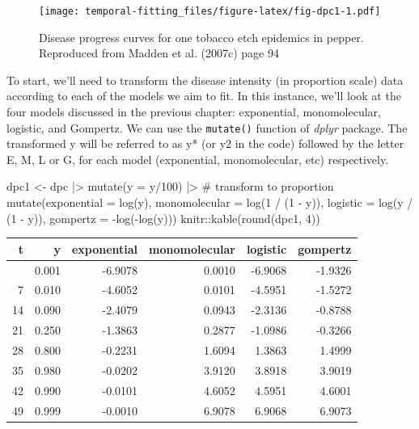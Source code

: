 \documentclass[
  letterpaper,
]{book}
\newenvironment{Shaded}{\begin{snugshade}}{\end{snugshade}}
\newcommand{\AttributeTok}[1]{\textcolor[rgb]{0.40,0.45,0.13}{#1}}
\newcommand{\CommentTok}[1]{\textcolor[rgb]{0.37,0.37,0.37}{#1}}
\newcommand{\DecValTok}[1]{\textcolor[rgb]{0.68,0.00,0.00}{#1}}
\newcommand{\FunctionTok}[1]{\textcolor[rgb]{0.28,0.35,0.67}{#1}}
\newcommand{\NormalTok}[1]{\textcolor[rgb]{0.00,0.23,0.31}{#1}}
\newcommand{\OtherTok}[1]{\textcolor[rgb]{0.00,0.23,0.31}{#1}}
\newcommand{\SpecialCharTok}[1]{\textcolor[rgb]{0.37,0.37,0.37}{#1}}
\begin{document}
\begin{figure}

\texttt{[image: temporal-fitting\_files/figure-latex/fig-dpc1-1.pdf]} \hfill{}

\caption{\label{fig-dpc1}Disease progress curves for one tobacco etch
epidemics in pepper. Reproduced from Madden et al. (2007c) page 94}

\end{figure}

To start, we'll need to transform the disease intensity (in proportion
scale) data according to each of the models we aim to fit. In this
instance, we'll look at the four models discussed in the previous
chapter: exponential, monomolecular, logistic, and Gompertz. We can use
the \texttt{mutate()} function of \emph{dplyr} package. The transformed
y will be referred to as y* (or y2 in the code) followed by the letter
E, M, L or G, for each model (exponential, monomolecular, etc)
respectively.

\begin{Shaded}
\begin{Highlighting}[]
\NormalTok{dpc1 }\OtherTok{\textless{}{-}}\NormalTok{ dpc }\SpecialCharTok{|\textgreater{}} 
  \FunctionTok{mutate}\NormalTok{(}\AttributeTok{y =}\NormalTok{ y}\SpecialCharTok{/}\DecValTok{100}\NormalTok{) }\SpecialCharTok{|\textgreater{}} \CommentTok{\# transform to proportion}
  \FunctionTok{mutate}\NormalTok{(}\AttributeTok{exponential =} \FunctionTok{log}\NormalTok{(y),}
         \AttributeTok{monomolecular =} \FunctionTok{log}\NormalTok{(}\DecValTok{1} \SpecialCharTok{/}\NormalTok{ (}\DecValTok{1} \SpecialCharTok{{-}}\NormalTok{ y)),}
         \AttributeTok{logistic =} \FunctionTok{log}\NormalTok{(y }\SpecialCharTok{/}\NormalTok{ (}\DecValTok{1} \SpecialCharTok{{-}}\NormalTok{ y)),}
         \AttributeTok{gompertz =} \SpecialCharTok{{-}}\FunctionTok{log}\NormalTok{(}\SpecialCharTok{{-}}\FunctionTok{log}\NormalTok{(y)))}
\NormalTok{knitr}\SpecialCharTok{::}\FunctionTok{kable}\NormalTok{(}\FunctionTok{round}\NormalTok{(dpc1, }\DecValTok{4}\NormalTok{)) }
\end{Highlighting}
\end{Shaded}

\begin{longtable}[]{@{}rrrrrr@{}}
\toprule\noalign{}
t & y & exponential & monomolecular & logistic & gompertz \\
\midrule\noalign{}
\endhead
\bottomrule\noalign{}
\endlastfoot
0 & 0.001 & -6.9078 & 0.0010 & -6.9068 & -1.9326 \\
7 & 0.010 & -4.6052 & 0.0101 & -4.5951 & -1.5272 \\
14 & 0.090 & -2.4079 & 0.0943 & -2.3136 & -0.8788 \\
21 & 0.250 & -1.3863 & 0.2877 & -1.0986 & -0.3266 \\
28 & 0.800 & -0.2231 & 1.6094 & 1.3863 & 1.4999 \\
35 & 0.980 & -0.0202 & 3.9120 & 3.8918 & 3.9019 \\
42 & 0.990 & -0.0101 & 4.6052 & 4.5951 & 4.6001 \\
49 & 0.999 & -0.0010 & 6.9078 & 6.9068 & 6.9073 \\
\end{longtable}
\end{document}
